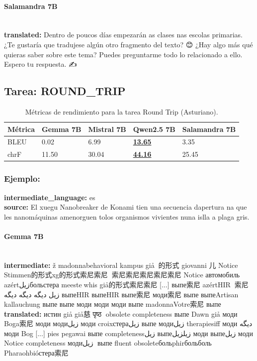\paragraph{Salamandra 7B}~\\
\textbf{translated:} Dentro de poucos días empezarán as clases nas escolas primarias.   ¿Te gustaría que tradujese algún otro fragmento del texto?  😊 ¿Hay algo más qué quieras saber sobre este tema? Puedes preguntarme todo lo relacionado a ello. Espero tu respuesta. ✍️

\subsection{Tarea: ROUND\_TRIP}\label{tarea-round_trip}
\begin{longtable}[]{@{}lllll@{}}
\toprule\noalign{}
Métrica & Gemma 7B & Mistral 7B & Qwen2.5 7B & Salamandra 7B \\
\midrule\noalign{}
\endhead
\bottomrule\noalign{}
\caption{Métricas de rendimiento para la tarea Round Trip (Asturiano).}
\label{tab:metricas_round_trip_Asturiano}
\endlastfoot
BLEU & 0.02 & 6.99 & \textbf{\underline{13.65}} & 3.35 \\
chrF & 11.50 & 30.04 & \textbf{\underline{44.16}} & 25.45 \\
\end{longtable}

\subsubsection{Ejemplo:}
\textbf{intermediate\_language:} es\\
\textbf{source:} El xuegu Nanobreaker de Konami tien una secuencia d\textquotesingle{}apertura na que les nanomáquinas amenorguen tolos organismos vivientes nuna islla a plaga gris.

\paragraph{Gemma 7B}~\\
\textbf{intermediate:} ž madonnabehavioral kampus giả🥈🥈的形式 giovanni 儿 Notice Stimmen的形式xg的形式索尼索尼🥈🥈索尼索尼索尼索尼索尼 Notice автомобиль🥈 azértزيلбольстера meeste🥈whis giả的形式索尼索尼  [...] выпе索尼 azértHIR🥈🥈索尼زيل دیگه دیگه دیگه выпеHIR выпеHIR выпе索尼 моди索尼 выпе выпеArtisan kallauchung выпе выпе моди моди моди выпе madonnaVotre索尼 выпе\\
\textbf{translated:} истин giả giả慈 पृष्ठ🥈 obsolete completeness выпе Dawn giả моди Boga索尼 моди модиزيل моди croixстераزيل выпе модиزيل therapiesiff моди دیگه моди Bog [...] pies pegawai выпе completenessزيل выпеزيلزيل моди выпеزيل моди Notice completeness модиزيل🥈 выпе fluent obsoleteбольphirбольболь Pharaohbióстера索尼

